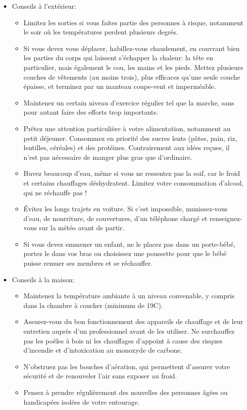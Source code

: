 \documentclass[11pt, french]{report}
\begin{document}
\begin{itemize}
\item Conseils à l'extérieur:
  \begin{itemize}
  \item Limitez les sorties si vous faites partie des personnes à risque, notamment le soir où les températures perdent plusieurs degrés.
  \item Si vous devez vous déplacer, habillez-vous chaudement, en couvrant bien les parties du corps qui laissent s'échapper la chaleur: la tête en particulier, mais également le cou, les mains et les pieds. Mettez plusieurs couches de vêtements (au moins trois), plus efficaces qu'une seule couche épaisse, et terminez par un manteau coupe-vent et imperméable.
  \item Maintenez un certain niveau d'exercice régulier tel que la marche, sans pour autant faire des efforts trop importants.
  \item Prêtez une attention particulière à votre alimentation, notamment au petit déjeuner. Consommez en priorité des sucres lents (pâtes, pain, riz, lentilles, céréales) et des protéines. Contrairement aux idées reçues, il n'est pas nécessaire de manger plus gras que d'ordinaire.
  \item Buvez beaucoup d'eau, même si vous ne ressentez pas la soif, car le froid et certains chauffages déshydratent. Limitez votre consommation d'alcool, qui ne réchauffe pas !
  \item Évitez les longs trajets en voiture. Si c'est impossible, munissez-vous d'eau, de nourriture, de couvertures, d'un téléphone chargé et renseignez-vous sur la météo avant de partir.
  \item  Si vous devez emmener un enfant, ne le placez pas dans un porte-bébé, portez le dans vos bras ou choisissez une poussette pour que le bébé puisse remuer ses membres et se réchauffer.
  \end{itemize}
\end{itemize}

\begin{itemize}
\item Conseils à la maison:
  \begin{itemize}
  \item Maintenez la température ambiante à un niveau convenable, y compris dans la chambre à coucher (minimum de 19\textdegree C).
  \item Assurez-vous du bon fonctionnement des appareils de chauffage et de leur entretien auprès d'un professionnel avant de les utiliser. Ne surchauffez pas les poêles à bois ni les chauffages d'appoint à cause des risques d'incendie et d'intoxication au monoxyde de carbone.
  \item N'obstruez pas les bouches d'aération, qui permettent d'assurer votre sécurité et de renouveler l'air sans exposer au froid.
  \item Pensez à prendre régulièrement des nouvelles des personnes âgées ou handicapées isolées de votre entourage.
  \end{itemize}
\end{itemize}
\end{document}
